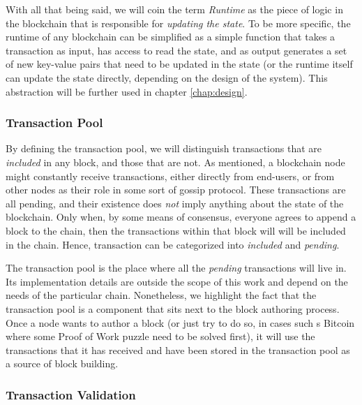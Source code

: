 With all that being said, we will coin the term \textit{Runtime} as the piece of logic in the
blockchain that is responsible for \textit{updating the state}. To be more specific, the runtime of
any blockchain can be simplified as a simple function that takes a transaction as input, has access
to read the state, and as output generates a set of new key-value pairs that need to be updated in
the state (or the runtime itself can update the state directly, depending on the design of the
system). This abstraction will be further used in chapter \ref{chap:design}.

\subsubsection{Transaction Pool} \label{chap_bg:subsec:tx_pool}

By defining the transaction pool, we will distinguish transactions that are \textit{included} in any
block, and those that are not. As mentioned, a blockchain node might constantly receive
transactions, either directly from end-users, or from other nodes as their role in some sort of
gossip protocol. These transactions are all pending, and their existence does \textit{not} imply
anything about the state of the blockchain. Only when, by some means of consensus, everyone agrees
to append a block to the chain, then the transactions within that block will will be included in the
chain. Hence, transaction can be categorized into \textit{included} and \textit{pending}.

The transaction pool is the place where all the \textit{pending} transactions will live in. Its
implementation details are outside the scope of this work and depend on the needs of the particular
chain. Nonetheless, we highlight the fact that the transaction pool is a component that sits next to
the block authoring process. Once a node wants to author a block (or just try to do so, in cases
such s Bitcoin where some Proof of Work puzzle need to be solved first), it will use the
transactions that it has received and have been stored in the transaction pool as a source of block
building.

\subsubsection{Transaction Validation} \label{chap_bg:subsec:validation}

